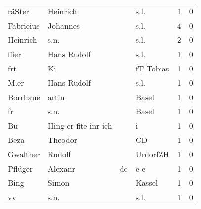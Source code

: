 \documentclass[10pt,a4paper,landscape]{article}
\begin{document}
\begin{longtable}{llllrr}
                   räSter &                           Heinrich &             &                                        s.l. &          1 &         0 \\
                Fabrieius &                           Johannes &             &                                        s.l. &          4 &         0 \\
                 Heinrich &                               s.n. &             &                                        s.l. &          2 &         0 \\
                    ffier &                        Hans Rudolf &             &                                        s.l. &          1 &         0 \\
                      frt &                                 Ki &             &                                   fT Tobias &          1 &         0 \\
                     M.er &                        Hans Rudolf &             &                                        s.l. &          1 &         0 \\
                 Borrhaue &                              artin &             &                                       Basel &          1 &         0 \\
                       fr &                               s.n. &             &                                       Basel &          1 &         0 \\
                       Bu &               Hing er fite inr ich &             &                                           i &          1 &         0 \\
                     Beza &                            Theodor &             &                                          CD &          1 &         0 \\
                 Gwalther &                             Rudolf &             &                                    UrdorfZH &          1 &         0 \\
                  Pflüger &                            Alexanr &          de &                                         e e &          1 &         0 \\
                     Bing &                              Simon &             &                                      Kassel &          1 &         0 \\
                       vv &                               s.n. &             &                                        s.l. &          1 &         0 \\

\end{longtable}
\end{document}
